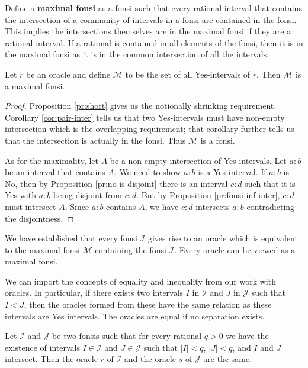 \documentclass[12pt]{article}
\begin{document}
Define a \textbf{maximal fonsi} as a fonsi such that every rational interval that contains the intersection of a community of intervals in a fonsi are contained in the fonsi. This implies the intersections themselves are in the maximal fonsi if they are a rational interval. If a rational is contained in  all elements of the fonsi, then it is in the maximal fonsi as it is in the common intersection of all the intervals. 

\begin{proposition} Let $r$ be an oracle and define $\mathcal{M}$ to be the set of all Yes-intervals of $r$. Then $\mathcal{M}$ is a maximal fonsi. 
\end{proposition}

\begin{proof}
     Proposition \ref{pr:short} gives us the notionally shrinking requirement. Corollary \ref{cor:pair-inter} tells us that two Yes-intervals must have non-empty intersection which is the overlapping requirement; that corollary further tells us that the intersection is actually in the fonsi. Thus $\mathcal{M}$ is a fonsi. 

     As for the maximality, let $A$ be a non-empty intersection of Yes intervals. Let $a:b$ be an interval that contains $A$. We need to show $a:b$ is a Yes interval. If $a:b$ is No, then by Proposition \ref{pr:no-is-disjoint} there is an interval $c:d$ such that it is Yes with $a:b$ being disjoint from $c:d$. But by Proposition \ref{pr:fonsi-inf-inter}, $c:d$ must intersect $A$. Since $a:b$ contains $A$, we have $c:d$ intersects $a:b$ contradicting the disjointness. 
\end{proof}

We have established that every fonsi $\mathcal{I}$ gives rise to an oracle which is equivalent to the maximal fonsi $\mathcal{M}$ containing the fonsi $\mathcal{I}$. Every oracle can be viewed as a maximal fonsi.

We can import the concepts of equality and inequality from our work with oracles. In particular, if there exists two intervals $I$ in $\mathcal{I}$ and $J$ in $\mathcal{J}$ such that $I < J$, then the oracles formed from these have the same relation as these intervals are Yes intervals. The oracles are equal if no separation exists. 

\begin{proposition}\label{pr:fonsi-inter}
Let $\mathcal{I}$ and $\mathcal{J}$ be two fonsis such that for every rational $q>0$ we have the existence of intervals $I \in \mathcal{I}$ and $J \in \mathcal{J}$ such that $|I| <q$, $|J| < q$, and $I$ and $J$ intersect. Then the oracle $r$ of $\mathcal{I}$ and the oracle $s$ of $\mathcal{J}$ are the same. 
\end{proposition}
\end{document}
